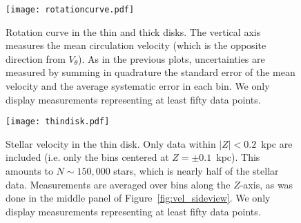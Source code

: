 \documentclass[11pt,preprint]{aastex6}
\begin{document}
\begin{figure}
\centering
\texttt{[image: rotationcurve.pdf]}
\caption{
   Rotation curve in the thin and thick disks. The vertical axis measures the mean circulation velocity (which is the opposite direction from $V_\theta$). As in the previous plots, uncertainties are measured by summing in quadrature the standard error of the mean velocity and the average systematic error in each bin. We only display measurements representing at least fifty data points. 
   \label{fig:rotationcurve}
}
\end{figure}

\begin{figure}
\centering
\texttt{[image: thindisk.pdf]}
\caption{
   Stellar velocity in the thin disk. Only data within $|Z| < 0.2$~kpc are included (i.e. only the bins centered at $Z = \pm0.1$~kpc). This amounts to $N\sim150,000$ stars, which is nearly half of the stellar data. Measurements are averaged over bins along the $Z$-axis, as was done in the middle panel of Figure~\ref{fig:vel_sideview}. We only display measurements representing at least fifty data points.
   \label{fig:thindisk}
}
\end{figure}

%
%
%
%
\end{document}
